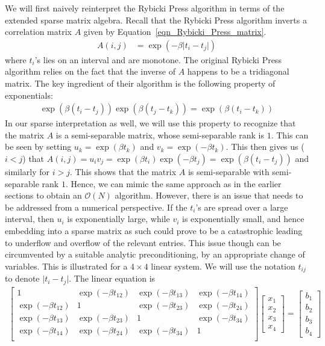 \documentclass[final,leqno]{siamltex}
\begin{document}
We will first naively reinterpret the Rybicki Press algorithm in terms of the extended sparse matrix algebra. Recall that the Rybicki Press algorithm inverts a correlation matrix $A$ given by Equation~\eqref{eqn_Rybicki_Press_matrix}.
\begin{align}
A(i,j) & = \exp\left(-\beta \lvert t_i - t_j \rvert\right)
\label{eqn_Rybicki_Press_matrix}
\end{align}
where $t_i$'s lies on an interval and are monotone. The original Rybicki Press algorithm relies on the fact that the inverse of $A$ happens to be a tridiagonal matrix. The key ingredient of their algorithm is the following property of exponentials:
\begin{align}
\exp\left(\beta (t_i-t_j) \right)\exp\left(\beta (t_j-t_k) \right) = \exp\left(\beta (t_i-t_k)\right)
\end{align}
In our sparse interpretation as well, we will use this property to recognize that the matrix $A$ is a semi-separable matrix, whose semi-separable rank is $1$. This can be seen by setting $u_k = \exp(\beta t_k)$ and $v_k = \exp(-\beta t_k)$. This then gives us ($i<j$) that $A(i,j) = u_i v_j = \exp(\beta t_i) \exp(-\beta t_j) = \exp(\beta(t_i-t_j))$ and similarly for $i>j$. This shows that the matrix $A$ is semi-separable with semi-separable rank $1$. Hence, we can mimic the same approach as in the earlier sections to obtain an $\mathcal{O}(N)$ algorithm. However, there is an issue that needs to be addressed from a numerical perspective. If the $t_i$'s are spread over a large interval, then $u_i$ is exponentially large, while $v_i$ is exponentially small, and hence embedding into a sparse matrix as such could prove to be a catastrophic leading to underflow and overflow of the relevant entries. This issue though can be circumvented by a suitable analytic preconditioning, by an appropriate change of variables. This is illustrated for a $4 \times 4$ linear system. We will use the notation $t_{ij}$ to denote $\lvert t_i - t_j\lvert$. The linear equation is
\begin{align}
\begin{bmatrix}
1 & \exp(-\beta t_{12}) & \exp(-\beta t_{13}) & \exp(-\beta t_{14})\\
\exp(-\beta t_{12}) & 1 & \exp(-\beta t_{23}) & \exp(-\beta t_{24})\\
\exp(-\beta t_{13}) & \exp(-\beta t_{23}) & 1 & \exp(-\beta t_{34})\\
\exp(-\beta t_{14}) & \exp(-\beta t_{24}) & \exp(-\beta t_{34}) & 1\\
\end{bmatrix}
\begin{bmatrix}
x_1\\x_2\\x_3\\x_4
\end{bmatrix}
=
\begin{bmatrix}
b_1\\b_2\\b_3\\b_4
\end{bmatrix}
\end{align}
\end{document}
